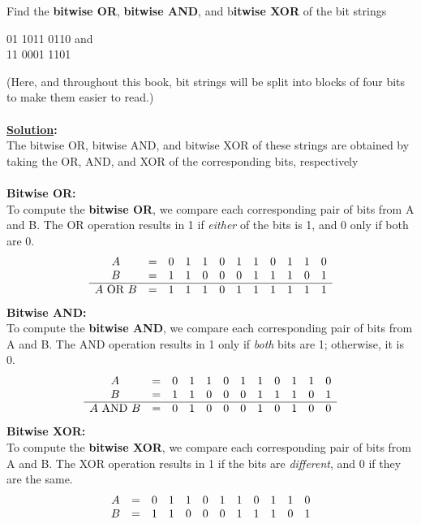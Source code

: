 \begin{tcolorbox}[title=Example of bitwise operations]
Find the \textbf{bitwise OR}, \textbf{bitwise AND}, and b\textbf{itwise XOR} of the bit strings
\begin{center}
01 1011 0110 and 
\\ 11 0001 1101
\end{center}
(Here, and throughout this book, bit strings will be split into blocks of four bits
to make them easier to read.)
\\ \\
\textbf{\underline{Solution}:} \\
The bitwise OR, bitwise AND, and bitwise XOR of these strings are obtained by taking
the OR, AND, and XOR of the corresponding bits, respectively \\ \\
\textbf{Bitwise OR:} \\
To compute the \textbf{bitwise OR}, we compare each corresponding pair of bits from A and B.  
The OR operation results in 1 if \textit{either} of the bits is 1, and 0 only if both are 0.
\[
\begin{array}{c c c c c c c c c c c c c}
A & = & 0 & 1 & 1 & 0 & 1 & 1 & 0 & 1 & 1 & 0 \\
B & = & 1 & 1 & 0 & 0 & 0 & 1 & 1 & 1 & 0 & 1 \\
\hline
A \text{ OR } B & = & 1 & 1 & 1 & 0 & 1 & 1 & 1 & 1 & 1 & 1
\end{array}
\]
\textbf{Bitwise AND:} \\
To compute the \textbf{bitwise AND}, we compare each corresponding pair of bits from A and B.  
The AND operation results in 1 only if \textit{both} bits are 1; otherwise, it is 0.
\[
\begin{array}{c c c c c c c c c c c c c}
A & = & 0 & 1 & 1 & 0 & 1 & 1 & 0 & 1 & 1 & 0 \\
B & = & 1 & 1 & 0 & 0 & 0 & 1 & 1 & 1 & 0 & 1 \\
\hline
A \text{ AND } B & = & 0 & 1 & 0 & 0 & 0 & 1 & 0 & 1 & 0 & 0
\end{array}
\]
\textbf{Bitwise XOR:} \\
To compute the \textbf{bitwise XOR}, we compare each corresponding pair of bits from A and B.  
The XOR operation results in 1 if the bits are \textit{different}, and 0 if they are the same.
\[
\begin{array}{c c c c c c c c c c c c c}
A & = & 0 & 1 & 1 & 0 & 1 & 1 & 0 & 1 & 1 & 0 \\
B & = & 1 & 1 & 0 & 0 & 0 & 1 & 1 & 1 & 0 & 1 \\

\end{array}\]
\end{tcolorbox}
